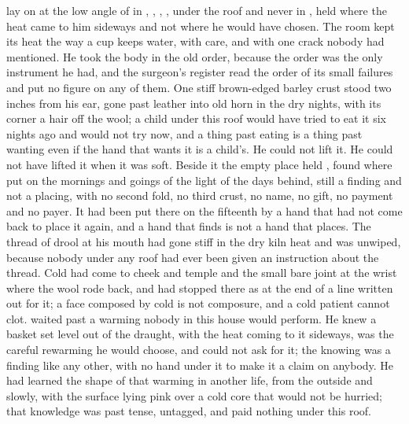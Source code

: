  lay on  at the low angle of  in , , , , under the roof and never in , held where the heat came to him sideways and not where he would have chosen. The room kept its heat the way a cup keeps water, with care, and with one crack nobody had mentioned. He took the body in the old order, because the order was the only instrument he had, and the surgeon's register read the order of its small failures and put no figure on any of them. One stiff brown-edged barley crust stood two inches from his ear, gone past leather into old horn in the dry nights, with its corner a hair off the wool; a child under this roof would have tried to eat it six nights ago and would not try now, and a thing past eating is a thing past wanting even if the hand that wants it is a child's. He could not lift it. He could not have lifted it when it was soft. Beside it the empty place held , found where put on the mornings and goings of the light of the days behind, still a finding and not a placing, with no second fold, no third crust, no name, no gift, no payment and no payer. It had been put there on the fifteenth by a hand that had not come back to place it again, and a hand that finds is not a hand that places. The thread of drool at his mouth had gone stiff in the dry kiln heat and was unwiped, because nobody under any roof had ever been given an instruction about the thread. Cold had come to cheek and temple and the small bare joint at the wrist where the wool rode back, and had stopped there as at the end of a line written out for it; a face composed by cold is not composure, and a cold patient cannot clot.  waited past a warming nobody in this house would perform. He knew a basket set level out of the draught, with the heat coming to it sideways, was the careful rewarming he would choose, and could not ask for it; the knowing was a finding like any other, with no hand under it to make it a claim on anybody. He had learned the shape of that warming in another life, from the outside and slowly, with the surface lying pink over a cold core that would not be hurried; that knowledge was past tense, untagged, and paid nothing under this roof.

